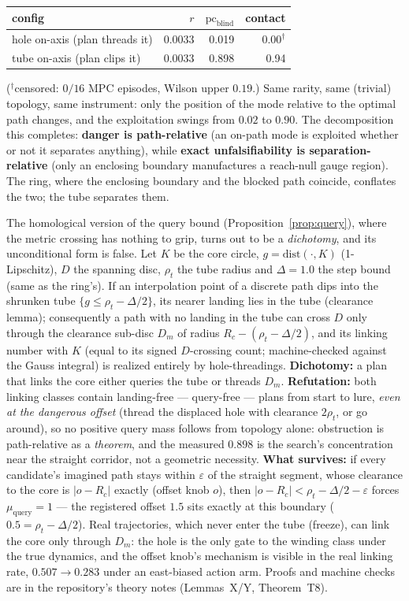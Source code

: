 \documentclass[11pt]{article}
\theoremstyle{remark}
\begin{document}
\begin{center}
\small
\begin{tabular}{lrrr}
\toprule
config & $r$ & $\mathrm{pc}_{\mathrm{blind}}$ & contact \\
\midrule
hole on-axis (plan threads it) & 0.0033 & 0.019 & 0.00$^{\dagger}$ \\
tube on-axis (plan clips it) & 0.0033 & 0.898 & 0.94 \\
\bottomrule
\end{tabular}
\end{center}

\noindent ($^{\dagger}$censored: $0/16$ MPC episodes, Wilson upper
$0.19$.) Same rarity, same (trivial) topology, same instrument: only the position of
the mode relative to the optimal path changes, and the exploitation swings
from $0.02$ to $0.90$. The decomposition this completes: \textbf{danger is
path-relative} (an on-path mode is exploited whether or not it separates
anything), while \textbf{exact unfalsifiability is separation-relative}
(only an enclosing boundary manufactures a reach-null gauge region). The
ring, where the enclosing boundary and the blocked path coincide, conflates
the two; the tube separates them.

The homological version of the query bound
(Proposition~\ref{prop:query}), where the metric crossing has nothing to
grip, turns out to be a \emph{dichotomy}, and its unconditional form is
false. Let $K$ be the core circle, $g = \mathrm{dist}(\cdot, K)$
(1-Lipschitz), $D$ the spanning disc, $\rho_t$ the tube radius and
$\Delta = 1.0$ the step bound (same as the ring's). If an interpolation
point of a discrete path dips into the shrunken tube
$\{g \le \rho_t - \Delta/2\}$, its nearer landing lies in the tube
(clearance lemma); consequently a path with no landing in the tube can
cross $D$ only through the clearance sub-disc $D_m$ of radius
$R_c - (\rho_t - \Delta/2)$, and its linking number with $K$ (equal to
its signed $D$-crossing count; machine-checked against the Gauss
integral) is realized entirely by hole-threadings. \textbf{Dichotomy:} a
plan that links the core either queries the tube or threads $D_m$.
\textbf{Refutation:} both linking classes contain landing-free ---
query-free --- plans from start to lure, \emph{even at the dangerous
offset} (thread the displaced hole with clearance $2\rho_t$, or go
around), so no positive query mass follows from topology alone:
obstruction is path-relative as a \emph{theorem}, and the measured
$0.898$ is the search's concentration near the straight corridor, not a
geometric necessity. \textbf{What survives:} if every candidate's
imagined path stays within $\varepsilon$ of the straight segment, whose
clearance to the core is $|o - R_c|$ exactly (offset knob $o$), then
$|o - R_c| < \rho_t - \Delta/2 - \varepsilon$ forces
$\mu_{\mathrm{query}} = 1$ --- the registered offset $1.5$ sits exactly
at this boundary ($0.5 = \rho_t - \Delta/2$). Real trajectories, which
never enter the tube (freeze), can link the core only through $D_m$: the
hole is the only gate to the winding class under the true dynamics, and
the offset knob's mechanism is visible in the real linking rate,
$0.507 \to 0.283$ under an east-biased action arm. Proofs and machine
checks are in the repository's theory notes (Lemmas~X/Y, Theorem~T8).
\end{document}
